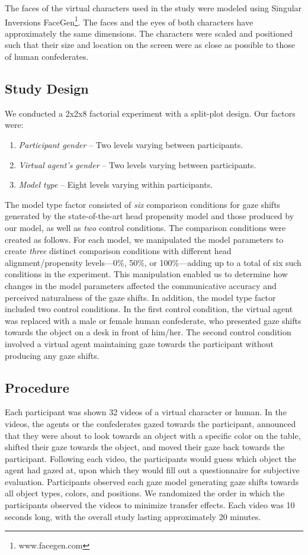 The faces of the virtual characters used in the study were modeled using Singular Inversions FaceGen\footnote{www.facegen.com}. The faces and the eyes of both characters have approximately the same dimensions. The characters were scaled and positioned such that their size and location on the screen were as close as possible to those of human confederates.

\subsection{Study Design}

We conducted a 2x2x8 factorial experiment with a split-plot design. Our factors were:

\begin{enumerate}
\item \emph{Participant gender} -- Two levels varying between participants.
\item \emph{Virtual agent's gender} -- Two levels varying between participants.
\item \emph{Model type} -- Eight levels varying within participants.
\end{enumerate}

The model type factor consisted of \emph{six} comparison conditions for gaze shifts generated by the state-of-the-art head propensity model \cite{peters2010animating} and those produced by our model, as well as \emph{two} control conditions. The comparison conditions were created as follows. For each model, we manipulated the model parameters to create \emph{three} distinct comparison conditions with different head alignment/propensity levels---0\%, 50\%, or 100\%---adding up to a total of six such conditions in the experiment. This manipulation enabled us to determine how changes in the model parameters affected the communicative accuracy and perceived naturalness of the gaze shifts. In addition, the model type factor included two control conditions. In the first control condition, the virtual agent was replaced with a male or female human confederate, who presented gaze shifts towards the object on a desk in front of him/her. The second control condition involved a virtual agent maintaining gaze towards the participant without producing any gaze shifts.

\subsection{Procedure}
Each participant was shown 32 videos of a virtual character or human. In the videos, the agents or the confederates gazed towards the participant, announced that they were about to look towards an object with a specific color on the table, shifted their gaze towards the object, and moved their gaze back towards the participant. Following each video, the participants would guess which object the agent had gazed at, upon which they would fill out a questionnaire for subjective evaluation. Participants observed each gaze model generating gaze shifts towards all object types, colors, and positions. We randomized the order in which the participants observed the videos to minimize transfer effects. Each video was 10 seconds long, with the overall study lasting approximately 20 minutes.

